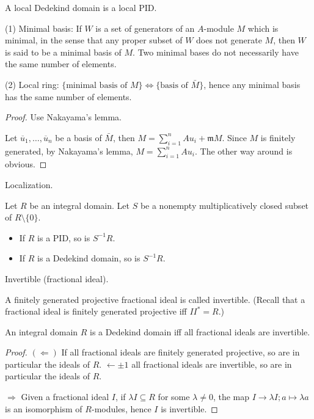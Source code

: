 \documentclass[11pt, a4paper]{report}
\begin{document}
\begin{corollary}
A local Dedekind domain is a local PID.
\end{corollary}

\begin{remark}
(1) Minimal basis: If $W$ is a set of generators of an $A$-module $M$ which is minimal, in the sense that any proper subset of $W$ does not generate $M$, then $W$ is said to be a minimal basis of $M$. Two minimal bases do not necessarily have the same number of elements.

(2) Local ring: $\{\text{minimal basis of } M\} \Leftrightarrow \{\text{basis of } \bar{M}\}$, hence any minimal basis has the same number of elements.
\end{remark}

\begin{proof}
Use Nakayama's lemma.

Let $\overline{u}_{1}, \ldots, \overline{u}_{n}$ be a basis of $\bar{M}$, then $M = \sum_{i=1}^{n} A u_{i} + \mathfrak{m} M$. Since $M$ is finitely generated, by Nakayama's lemma, $M = \sum_{i=1}^{n} A u_{i}$. The other way around is obvious.
\end{proof}

\begin{proposition}
Localization.

Let $R$ be an integral domain. Let $S$ be a nonempty multiplicatively closed subset of $R \setminus \{0\}$.
\begin{itemize}
\item If $R$ is a PID, so is $S^{-1} R$.
\item If $R$ is a Dedekind domain, so is $S^{-1} R$.
\end{itemize}
\end{proposition}

\begin{definition}
Invertible (fractional ideal).

A finitely generated projective fractional ideal is called invertible.
(Recall that a fractional ideal is finitely generated projective iff $II^{*} = R$.)
\end{definition}

\begin{lemma}
An integral domain $R$ is a Dedekind domain iff all fractional ideals are invertible.
\end{lemma}

\begin{proof}
$(\Leftarrow)$ If all fractional ideals are finitely generated projective, so are in particular the ideals of $R$.
$\leftarrow \pm 1$ all fractional ideals are invertible, so are in particular the ideals of $R$.

$\Rightarrow$ Given a fractional ideal $I$, if $\lambda I \subseteq R$ for some $\lambda \neq 0$, the map $I \rightarrow \lambda I; a \mapsto \lambda a$ is an isomorphism of $R$-modules, hence $I$ is invertible.
\end{proof}
\end{document}
